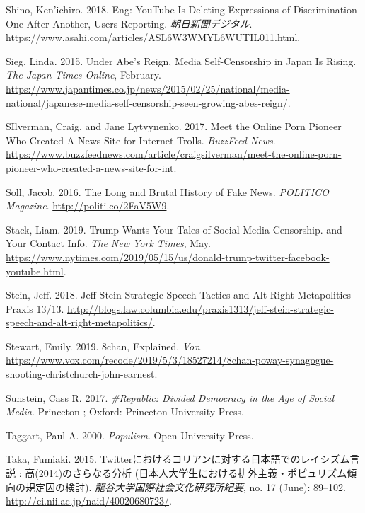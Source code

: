 \documentclass[10pt,british,A4paper,,openany]{memoir}
\begin{document}
\hypertarget{ref-shino_eng:_2018}{}
Shino, Ken'ichiro. 2018. Eng: YouTube Is Deleting Expressions of
Discrimination One After Another, Users Reporting.
\emph{朝日新聞デジタル}.
\url{https://www.asahi.com/articles/ASL6W3WMYL6WUTIL011.html}.

\hypertarget{ref-sieg_under_2015}{}
Sieg, Linda. 2015. Under Abe's Reign, Media Self-Censorship in Japan Is
Rising. \emph{The Japan Times Online}, February.
\url{https://www.japantimes.co.jp/news/2015/02/25/national/media-national/japanese-media-self-censorship-seen-growing-abes-reign/}.

\hypertarget{ref-silverman_meet_2017}{}
SIlverman, Craig, and Jane Lytvynenko. 2017. Meet the Online Porn
Pioneer Who Created A News Site for Internet Trolls. \emph{BuzzFeed
News}.
\url{https://www.buzzfeednews.com/article/craigsilverman/meet-the-online-porn-pioneer-who-created-a-news-site-for-int}.

\hypertarget{ref-soll_long_2016}{}
Soll, Jacob. 2016. The Long and Brutal History of Fake News.
\emph{POLITICO Magazine}. \url{http://politi.co/2FaV5W9}.

\hypertarget{ref-stack_trump_2019}{}
Stack, Liam. 2019. Trump Wants Your Tales of Social Media Censorship.
and Your Contact Info. \emph{The New York Times}, May.
\url{https://www.nytimes.com/2019/05/15/us/donald-trump-twitter-facebook-youtube.html}.

\hypertarget{ref-stein_jeff_2018}{}
Stein, Jeff. 2018. Jeff Stein Strategic Speech Tactics and Alt-Right
Metapolitics -- Praxis 13/13.
\url{http://blogs.law.columbia.edu/praxis1313/jeff-stein-strategic-speech-and-alt-right-metapolitics/}.

\hypertarget{ref-stewart_8chan_2019}{}
Stewart, Emily. 2019. 8chan, Explained. \emph{Vox}.
\url{https://www.vox.com/recode/2019/5/3/18527214/8chan-poway-synagogue-shooting-christchurch-john-earnest}.

\hypertarget{ref-sunstein_republic:_2017}{}
Sunstein, Cass R. 2017. \emph{\#Republic: Divided Democracy in the Age
of Social Media}. Princeton ; Oxford: Princeton University Press.

\hypertarget{ref-taggart_populism_2000}{}
Taggart, Paul A. 2000. \emph{Populism}. Open University Press.

\hypertarget{ref-taka_twitter_2015-1}{}
Taka, Fumiaki. 2015.
Twitterにおけるコリアンに対する日本語でのレイシズム言説 :
高(2014)のさらなる分析
(日本人大学生における排外主義・ポピュリズム傾向の規定囚の検討).
\emph{龍谷大学国際社会文化研究所紀要}, no. 17 (June): 89--102.
\url{http://ci.nii.ac.jp/naid/40020680723/}.
\end{document}
